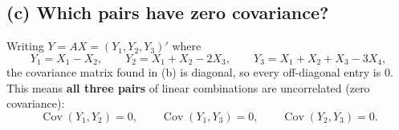 \documentclass[11pt]{article}
\begin{document}
\subsection*{(c) Which pairs have zero covariance?}
Writing $Y = AX = (Y_1,Y_2,Y_3)'$ where
\[
Y_1 = X_1-X_2,\qquad Y_2 = X_1+X_2-2X_3,\qquad Y_3 = X_1+X_2+X_3-3X_4,
\]
the covariance matrix found in (b) is diagonal, so every off-diagonal entry is $0$. This means \textbf{all three pairs} of linear combinations are uncorrelated (zero covariance):
\[
\operatorname{Cov}(Y_1,Y_2)=0,\qquad \operatorname{Cov}(Y_1,Y_3)=0,\qquad \operatorname{Cov}(Y_2,Y_3)=0.
\]
\end{document}
